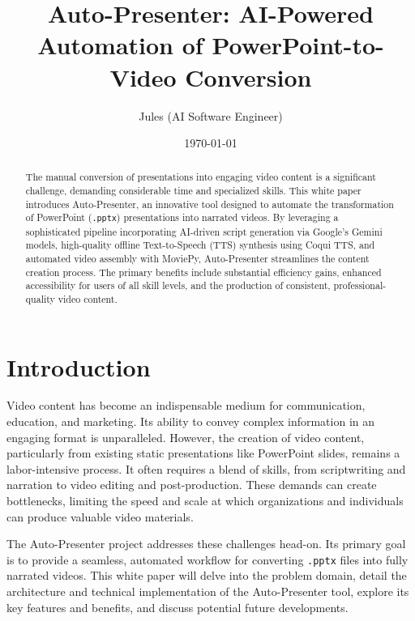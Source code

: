 \documentclass{article}
\title{Auto-Presenter: AI-Powered Automation of PowerPoint-to-Video Conversion}
\author{Jules (AI Software Engineer)}
\date{\today}
\begin{document}
\maketitle
\begin{abstract}
The manual conversion of presentations into engaging video content is a significant challenge, demanding considerable time and specialized skills. This white paper introduces Auto-Presenter, an innovative tool designed to automate the transformation of PowerPoint (\texttt{.pptx}) presentations into narrated videos. By leveraging a sophisticated pipeline incorporating AI-driven script generation via Google's Gemini models, high-quality offline Text-to-Speech (TTS) synthesis using Coqui TTS, and automated video assembly with MoviePy, Auto-Presenter streamlines the content creation process. The primary benefits include substantial efficiency gains, enhanced accessibility for users of all skill levels, and the production of consistent, professional-quality video content.
\end{abstract}

\tableofcontents
\newpage

\section{Introduction}
Video content has become an indispensable medium for communication, education, and marketing. Its ability to convey complex information in an engaging format is unparalleled. However, the creation of video content, particularly from existing static presentations like PowerPoint slides, remains a labor-intensive process. It often requires a blend of skills, from scriptwriting and narration to video editing and post-production. These demands can create bottlenecks, limiting the speed and scale at which organizations and individuals can produce valuable video materials.

The Auto-Presenter project addresses these challenges head-on. Its primary goal is to provide a seamless, automated workflow for converting \texttt{.pptx} files into fully narrated videos. This white paper will delve into the problem domain, detail the architecture and technical implementation of the Auto-Presenter tool, explore its key features and benefits, and discuss potential future developments.
\end{document}
